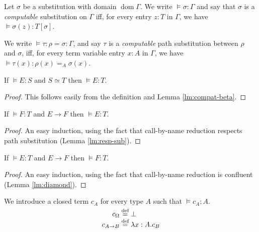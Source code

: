 \documentclass[a4paper,UKenglish]{lipics-v2016}
\newcommand*{\eqdef}{\mathrel{\smash{\stackrel{\text{def}}{=}}}}
\newcommand*{\dom}{\ensuremath{\operatorname{dom}}}
\theoremstyle{plain}
\theoremstyle{definition}
\begin{document}
\begin{definition}
Let $\sigma$ be a substitution with domain $\dom \Gamma$.  We write $\models \sigma : \Gamma$ and say that
$\sigma$ is a \emph{computable} substitution on $\Gamma$ iff, for every entry $z : T$ in $\Gamma$, we have $\models \sigma(z) : T [ \sigma ]$.

We write $\models \tau : \rho = \sigma : \Gamma $, and say $\tau$ is a \emph{computable} path substitution between $\rho$ and $\sigma$, iff, for every term variable entry $x : A$ in $\Gamma$, we have $\models \tau(x) : \rho(x) =_A \sigma(x)$.
\end{definition}

\begin{lemma}[Conversion]
\label{lm:conv-compute}
If $\models E : S$ and $S \simeq T$ then $\models E : T$.
\end{lemma}

\begin{proof}
This follows easily from the definition and Lemma \ref{lm:compat-beta}.
\end{proof}

\begin{lemma}[Expansion]
\label{lm:expansion}
If $\models F : T$ and $E \rightarrow F$ then $\models E : T$.
\end{lemma}

\begin{proof}
An easy induction, using the fact that call-by-name reduction respects path substitution (Lemma \ref{lm:resp-sub}).
\end{proof}

\begin{lemma}[Reduction]
\label{lm:reduction}
If $\models E : T$ and $E \rightarrow F$ then $\models F : T$.
\end{lemma}

\begin{proof}
An easy induction, using the fact that call-by-name reduction is confluent (Lemma \ref{lm:diamond}).
\end{proof}

\begin{definition}
We introduce a closed term $c_A$ for every type $A$ such that $\models c_A : A$.
\begin{align*}
c_\Omega & \eqdef \bot \\
c_{A \rightarrow B} & \eqdef \lambda x:A.c_B
\end{align*}
\end{definition}
\end{document}
